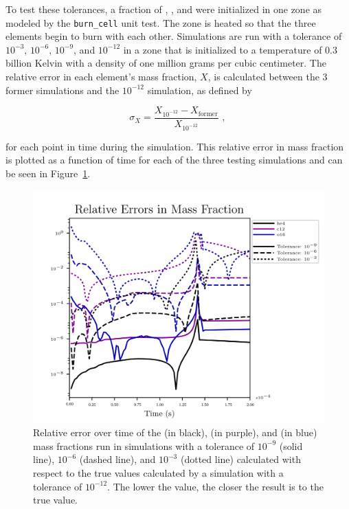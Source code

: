 \documentclass[preprint]{aastex62}
\begin{document}
      To test these tolerances, a fraction of  , , and  were initialized in one zone as modeled by the {\tt burn\_cell} unit test. The zone is heated so that the three elements begin to burn with each other. Simulations are run with a tolerance of $10^{-3}$, $10^{-6}$, $10^{-9}$, and $10^{-12}$ in a zone that is initialized to a temperature of 0.3 billion Kelvin with a density of one million grams per cubic centimeter. The relative error in each element's mass fraction, $X$, is calculated between the 3 former simulations and the $10^{-12}$ simulation, as defined by 
    
      \begin{equation}
        \sigma_X = \frac{X_{10^{-12}} - X_{\text{former}}}{X_{10^{-12}}} \text{    , }
        \label{eq:relativeerror}
      \end{equation}
    
      for each point in time during the simulation. This relative error in mass fraction is plotted as a function of time for each of the three testing simulations and can be seen in Figure~\ref{fig:relativeerror}.
    
      \begin{figure}
        \centering
        \includegraphics[width=5in]{images/react_aprox13_test13_ureca_tol-rel_xn1.png}
        \caption{Relative error over time of the  (in black),  (in purple), and  (in blue) mass fractions run in simulations with a tolerance of $10^{-9}$ (solid line), $10^{-6}$ (dashed line), and $10^{-3}$ (dotted line) calculated with respect to the true values calculated by a simulation with a tolerance of $10^{-12}$. The lower the value, the closer the result is to the true value.
          }
        \label{fig:relativeerror}
      \end{figure}  
  
\end{document}
